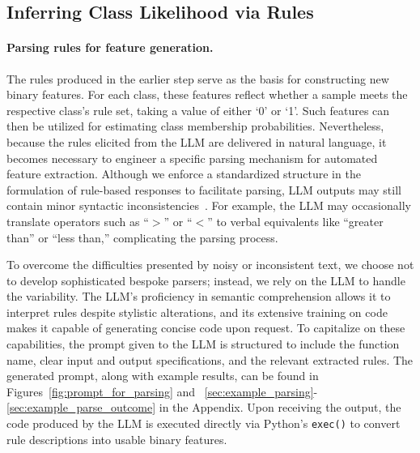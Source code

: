 \subsection{Inferring Class Likelihood via Rules}
\label{Sec:training}

\paragraph{Parsing rules for feature generation.} The rules produced in the earlier step serve as the basis for constructing new binary features. For each class, these features reflect whether a sample meets the respective class’s rule set, taking a value of either ‘0’ or ‘1’. Such features can then be utilized for estimating class membership probabilities. Nevertheless, because the rules elicited from the LLM are delivered in natural language, it becomes necessary to engineer a specific parsing mechanism for automated feature extraction. Although we enforce a standardized structure in the formulation of rule-based responses to facilitate parsing, LLM outputs may still contain minor syntactic inconsistencies~\cite{kovavc2023large}. For example, the LLM may occasionally translate operators such as “$>$” or “$<$” to verbal equivalents like “greater than” or “less than,” complicating the parsing process.

To overcome the difficulties presented by noisy or inconsistent text, we choose not to develop sophisticated bespoke parsers; instead, we rely on the LLM to handle the variability. The LLM’s proficiency in semantic comprehension allows it to interpret rules despite stylistic alterations, and its extensive training on code makes it capable of generating concise code upon request. To capitalize on these capabilities, the prompt given to the LLM is structured to include the function name, clear input and output specifications, and the relevant extracted rules. The generated prompt, along with example results, can be found in Figures~\ref{fig:prompt_for_parsing} and ~\ref{sec:example_parsing}-\ref{sec:example_parse_outcome} in the Appendix. Upon receiving the output, the code produced by the LLM is executed directly via Python's \texttt{exec()} to convert rule descriptions into usable binary features.

\vspace*{-0.12in}
